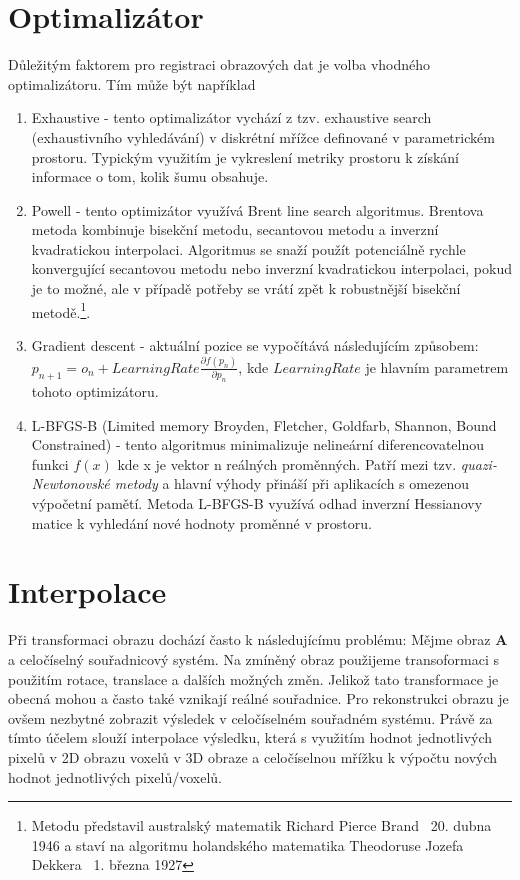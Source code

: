 \documentclass{thesis}%
\begin{document}
\section{Optimalizátor}
Důležitým faktorem pro registraci obrazových dat je volba vhodného optimalizátoru. Tím může být například


\begin{enumerate}
	\item Exhaustive - tento optimalizátor vychází z tzv. exhaustive search (exhaustivního vyhledávání) v diskrétní mřížce definované v parametrickém prostoru. Typickým využitím je vykreslení metriky prostoru k získání informace o tom, kolik šumu obsahuje.
	\item Powell - tento optimizátor využívá Brent line search algoritmus. Brentova metoda kombinuje bisekční metodu, secantovou metodu a inverzní kvadratickou interpolaci. Algoritmus se snaží použít potenciálně rychle konvergující secantovou metodu nebo inverzní kvadratickou interpolaci, pokud je to možné, ale v případě potřeby se vrátí zpět k robustnější bisekční metodě.\footnote[15]{Metodu představil australský matematik Richard Pierce Brand \gtrsymBorn~20. dubna 1946 a staví na algoritmu holandského matematika Theodoruse Jozefa Dekkera  \gtrsymBorn~1. března 1927}.
	\item Gradient descent - aktuální pozice se vypočítává následujícím způsobem: $p_{n+1}=o_n+LearningRate\frac{\partial f(p_n)}{\partial p_n}$,  kde $LearningRate$ je hlavním parametrem tohoto optimizátoru.
	\item L-BFGS-B (Limited memory Broyden, Fletcher, Goldfarb, Shannon, Bound Constrained) - tento algoritmus minimalizuje nelineární diferencovatelnou funkci $f(x)$ kde  x je vektor n reálných proměnných. Patří mezi tzv. \textit{quazi-Newtonovské metody} a hlavní výhody přináší při aplikacích s omezenou výpočetní pamětí. Metoda L-BFGS-B využívá odhad inverzní Hessianovy matice k vyhledání nové hodnoty proměnné v prostoru.
\end{enumerate}







\section{Interpolace}
Při transformaci obrazu dochází často k následujícímu problému: Mějme obraz $\mathbf{A}$ a celočíselný souřadnicový systém. Na zmíněný obraz použijeme transoformaci s použitím rotace, translace a dalších možných změn. Jelikož tato transformace je obecná mohou a často také vznikají reálné souřadnice. Pro rekonstrukci obrazu je ovšem nezbytné zobrazit výsledek v celočíselném souřadném systému. Právě za tímto účelem slouží interpolace výsledku, která s využitím hodnot jednotlivých pixelů v 2D obrazu voxelů v 3D obraze a celočíselnou mřížku k výpočtu nových hodnot jednotlivých pixelů/voxelů.
\end{document}

